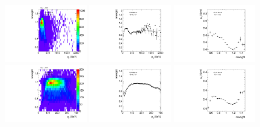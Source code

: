 \begin{figure}[htbp!]
\begin{center}
\includegraphics[width=0.32\textwidth,angle=-90]{figures/boosted/AppendixReweight/Weights/2Trk_split_Signal_leadHCand_trk0_Pt_weight.pdf}
\includegraphics[width=0.32\textwidth,angle=-90]{figures/boosted/AppendixReweight/Weights/2Trk_split_Signal_leadHCand_trk0_Pt_weight_profx.pdf}
\includegraphics[width=0.32\textwidth,angle=-90]{figures/boosted/AppendixReweight/Weights/2Trk_split_Signal_leadHCand_trk0_Pt_weight_profy.pdf}\\
\includegraphics[width=0.32\textwidth,angle=-90]{figures/boosted/AppendixReweight/Weights/2Trk_split_Signal_sublHCand_trk0_Pt_weight.pdf}
\includegraphics[width=0.32\textwidth,angle=-90]{figures/boosted/AppendixReweight/Weights/2Trk_split_Signal_sublHCand_trk0_Pt_weight_profx.pdf}
\includegraphics[width=0.32\textwidth,angle=-90]{figures/boosted/AppendixReweight/Weights/2Trk_split_Signal_sublHCand_trk0_Pt_weight_profy.pdf}\\

\end{center}
\end{figure}
